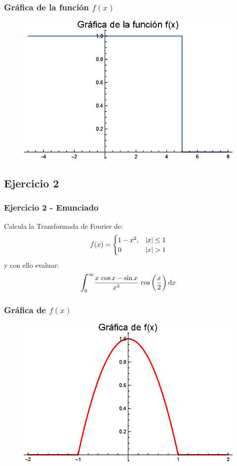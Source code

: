 \documentclass[12pt]{beamer}
\begin{document}
\begin{frame}
\frametitle{Gráfica de la función $f (x)$}
\begin{figure}
  \centering
  \includegraphics[scale=1]{Imagenes/Plot_Fourier_Ejercicios_03_sinc_x.eps}
\end{figure}
\end{frame}

\subsection*{Ejercicio 2}

\begin{frame}
\frametitle{Ejercicio 2 - Enunciado}
Calcula la Transformada de Fourier de:
\pause
\begin{align*}
f (x) = \begin{cases}
1 -x^{2}, & \abs{x} \leq 1 \\
0 & \abs{x} > 1
\end{cases}
\end{align*}
\pause
y con ello evaluar:
\pause
\begin{align*}
\scaleint{6ex}_{\bs 0}^{\infty} \dfrac{x \, \cos x - \sin x}{x^{3}} \, \cos \bigg( \dfrac{x}{2} \bigg) \dd{x}
\end{align*}
\end{frame}
\begin{frame}
\frametitle{Gráfica de $f(x)$}
\begin{figure}
  \centering
  \includegraphics[scale=1]{Imagenes/Plot_Fourier_Ejercicio_02_01.eps}
\end{figure}
\end{frame}
\end{document}
